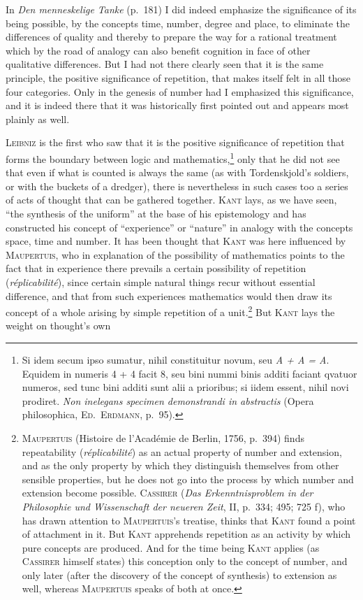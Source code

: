 \documentclass[12pt]{book}
\begin{document}
In \textit{Den menneskelige Tanke} (p.\ 181) I did indeed emphasize the
significance of its being possible, by the concepts time, number, degree and
place, to eliminate the differences of quality and thereby to prepare the way for
a rational treatment which by the road of analogy can also benefit cognition in
face of other qualitative differences. But I had not there clearly seen that it
is the same principle, the positive significance of repetition, that makes itself
felt in all those four categories. Only in the genesis of number had I emphasized
this significance, and it is indeed there that it was historically first pointed
out and appears most plainly as well.

\textsc{Leibniz} is the first who saw that it is the positive significance of
repetition that forms the boundary between logic and
mathematics,\footnote{Si idem secum ipso sumatur, nihil constituitur novum, seu
\textit{A + A = A}. Equidem in numeris 4 + 4 facit 8, seu bini nummi binis
additi faciant qvatuor numeros, sed tunc bini additi sunt alii a prioribus; si
iidem essent, nihil novi prodiret. \textit{Non inelegans specimen demonstrandi in
abstractis} (Opera philosophica, \textsc{Ed.\ Erdmann}, p.\ 95).} only that he
did not see that even if what is counted is always the same (as with
Tordenskjold's soldiers, or with the buckets of a dredger), there is nevertheless
in such cases too a series of acts of thought that can be gathered together.
\textsc{Kant} lays, as we have seen, ``the synthesis of the uniform'' at the base
of his epistemology and has constructed his concept of ``experience'' or
``nature'' in analogy with the concepts space, time and number. It has been
thought that \textsc{Kant} was here influenced by \textsc{Maupertuis}, who in
explanation of the possibility of mathematics points to the fact that in
experience there prevails a certain possibility of repetition
(\textit{réplicabilité}), since certain simple natural things recur without
essential difference, and that from such experiences mathematics would then draw
its concept of a whole arising by simple repetition of a
unit.\footnote{\textsc{Maupertuis} (Histoire de l'Académie de Berlin, 1756,
p.\ 394) finds repeatability (\textit{réplicabilité}) as an actual property of
number and extension, and as the only property by which they distinguish
themselves from other sensible properties, but he does not go into the process by
which number and extension become possible. \textsc{Cassirer} (\textit{Das
Erkenntnisproblem in der Philosophie und Wissenschaft der neueren Zeit}, II,
p.\ 334; 495; 725 f), who has drawn attention to \textsc{Maupertuis}'s treatise,
thinks that \textsc{Kant} found a point of attachment in it. But \textsc{Kant}
apprehends repetition as an activity by which pure concepts are produced. And for
the time being \textsc{Kant} applies (as \textsc{Cassirer} himself states) this
conception only to the concept of number, and only later (after the discovery of
the concept of synthesis) to extension as well, whereas \textsc{Maupertuis}
speaks of both at once.} But \textsc{Kant} lays the weight on thought's own
\end{document}
